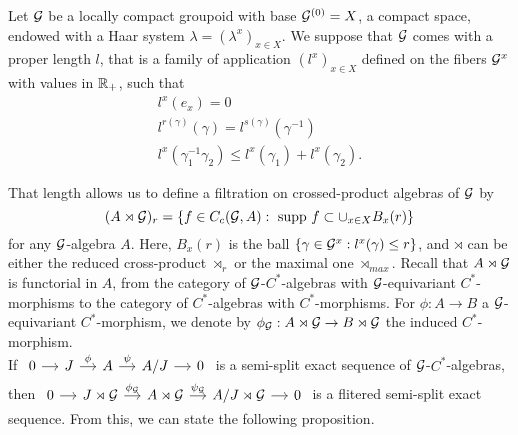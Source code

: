 Let $\mathcal G$ be a locally compact groupoid with base $\mathcal G^{(0)}=X$, a compact space, endowed with a Haar system $\lambda=(\lambda^x)_{x\in X}$. We suppose that $\mathcal G$ comes with a proper length $l$, that is a family of application $(l^x)_{x\in X}$ defined on the fibers $\mathcal G^x$ with values in $\mathbb R_+$, such that
\[\begin{array}{l}
l^x(e_x)=0 \\
l^{r(\gamma)}(\gamma)=l^{s(\gamma)}(\gamma^{-1}) \\
l^x (\gamma_1^{-1} \gamma_2)	\leq l^x(\gamma_1)+l^x(\gamma_2) .	
\end{array}\]

That length allows us to define a filtration on crossed-product algebras of $\mathcal G$ by
\[(A\rtimes \mathcal G)_r = \{f\in C_c(\mathcal G, A) : \text{ supp }f \subset \cup_{x\in X} B_x(r)\}\]
for any $\mathcal G$-algebra $A$. Here, $B_x(r)$ is the ball $\{\gamma \in \mathcal G^x : l^x(\gamma)\leq r\}$, and $\rtimes$ can be either the reduced cross-product $\rtimes_r$ or the maximal one $\rtimes_{max}$. Recall that $A\rtimes \mathcal G$ is functorial in $A$, from the category of $\mathcal G$-$C^*$-algebras with $\mathcal G$-equivariant $C^*$-morphisms to the category of $C^*$-algebras with $C^*$-morphisms. For $\phi : A\rightarrow B$ a $\mathcal G$-equivariant $C^*$-morphism, we denote by $\phi_\mathcal G : A\rtimes\mathcal G \rightarrow B\rtimes\mathcal G$ the induced $C^*$-morphism.\\

If $\begin{tikzcd}[column sep = small]
0 \arrow{r} & J\arrow{r}{\phi}& A \arrow{r}{\psi} & A/J \arrow{r} & 0
\end{tikzcd}$ is a semi-split exact sequence of $\mathcal G$-$C^*$-algebras, then 
$\begin{tikzcd}[column sep = small]
0 \arrow{r} & J\rtimes \G\arrow{r}{\phi_\G}& A\rtimes \G \arrow{r}{\psi_\G} & A/J\rtimes \G \arrow{r} & 0
\end{tikzcd}$ is a flitered semi-split exact sequence. From this, we can state the following proposition.\\

